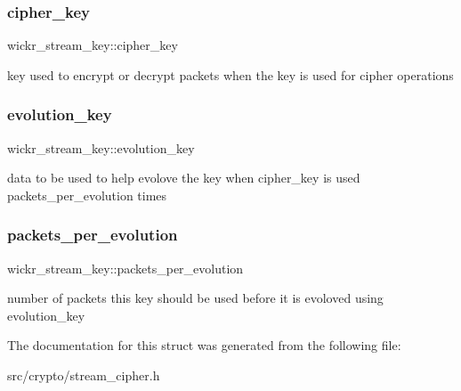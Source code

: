 \subsubsection{\texorpdfstring{cipher\+\_\+key}{cipher\_key}}
{\footnotesize\ttfamily wickr\+\_\+stream\+\_\+key\+::cipher\+\_\+key}

key used to encrypt or decrypt packets when the key is used for cipher operations \mbox{\label{structwickr__stream__key_ae7210bd67e61cb4c38733a237dae95d9}} 
\subsubsection{\texorpdfstring{evolution\+\_\+key}{evolution\_key}}
{\footnotesize\ttfamily wickr\+\_\+stream\+\_\+key\+::evolution\+\_\+key}

data to be used to help evolove the key when \textquotesingle{}cipher\+\_\+key\textquotesingle{} is used \textquotesingle{}packets\+\_\+per\+\_\+evolution\textquotesingle{} times \mbox{\label{structwickr__stream__key_a78777e4c64048b6dae38f8772744194e}} 
\subsubsection{\texorpdfstring{packets\+\_\+per\+\_\+evolution}{packets\_per\_evolution}}
{\footnotesize\ttfamily wickr\+\_\+stream\+\_\+key\+::packets\+\_\+per\+\_\+evolution}

number of packets this key should be used before it is evoloved using \textquotesingle{}evolution\+\_\+key\textquotesingle{} 

The documentation for this struct was generated from the following file\+:\begin{DoxyCompactItemize}
\item 
src/crypto/stream\+\_\+cipher.\+h\end{DoxyCompactItemize}
